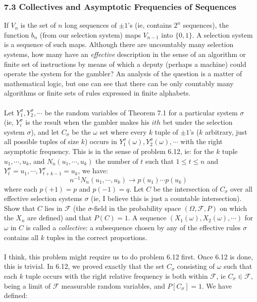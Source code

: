 \documentclass[12pt,a4paper]{article}
\newcommand{\1}[1]{\mathbbm{1}\left\{ #1 \right\}}
\newcommand{\fcal}{\mathcal{F}}
\begin{document}
\subsubsection{7.3 Collectives and Asymptotic Frequencies of Sequences} If $V_n$ is the set of $n$ long sequences of $\pm 1$'s (ie, contains $2^n$ sequences), the function $b_n$ (from our selection system) maps $V_{n-1}$ into $\{0,1\}$. A selection system is a sequence of such maps. Although there are uncountably many selection systems, how many have an \textit{effective} description in the sense of an algorithm or finite set of instructions by means of which a deputy (perhaps a machine) could operate the system for the gambler? An analysis of the question is a matter of mathematical logic, but one can see that there can be only countably many algorithms or finite sets of rules expressed in finite alphabets.
\\\\
Let $Y_1^\sigma, Y_2^\sigma, \cdots$ be the random variables of Theorem 7.1 for a particular system $\sigma$ (ie, $Y_i^\sigma$ is the result when the gambler makes his $ith$ bet under the selection system $\sigma$), and let $C_\sigma$ be the $\omega$ set where every $k$ tuple of $\pm 1$'s ($k$ arbitrary, just all possible tuples of size $k$) occurs in $Y_1^\sigma(\omega), Y_2^\sigma(\omega), \cdots$ with the right asymptotic frequency. This is in the sense of problem 6.12, ie: for the $k$ tuple $u_1, \cdots, u_k$, and $N_n(u_1, \cdots, u_k)$ the number of $t$ such that $1 \leq t \leq n$ and $Y_t^\sigma = u_1, \cdots, Y_{t+k-1}^\sigma = u_k$, we have:
$$
	n^{-1}N_n(u_1, \cdots, u_k) \to p(u_1) \cdots p(u_k)
$$
where each $p(+1) = p$ and $p(-1) = q$. Let $C$ be the intersection of $C_\sigma$ over all effective selection systems $\sigma$ (ie, I believe this is just a countable intersection). Show that $C$ lies in $\fcal$ (the $\sigma$-field in the probability space $(\Omega,\fcal,P)$ on which the $X_n$ are defined) and that $P(C) = 1$. A sequence $(X_1(\omega), X_2(\omega), \cdots)$ for $\omega$ in $C$ is called a \textit{collective}: a subsequence chosen by any of the effective rules $\sigma$ contains all $k$ tuples in the correct proportions.
\\\\
I think, this problem might require us to do problem 6.12 first. Once 6.12 is done, this is trivial. In 6.12, we proved exactly that the set $C_\sigma$ consisting of $\omega$ such that each $k$ tuple occurs with the right relative frequency is both within $\fcal$, ie $C_\sigma \in \fcal$, being a limit of $\fcal$ measurable random variables, and $P[C_\sigma] = 1$. We have defined:
\end{document}
